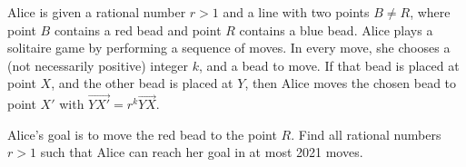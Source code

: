 Alice is given a rational number $r > 1$ and a line with two points $B \neq R$, where point $B$ contains a red bead and point $R$ contains a blue bead. Alice plays a solitaire game by performing a sequence of moves. In every move, she chooses a (not necessarily positive) integer $k$, and a bead to move. If that bead is placed at point $X$, and the other bead is placed at $Y$, then Alice moves the chosen bead to point $X'$ with $\overrightarrow{YX'} = r^k \overrightarrow{YX}$.

Alice's goal is to move the red bead to the point $R$. Find all rational numbers $r > 1$ such that Alice can reach her goal in at most 2021 moves.
